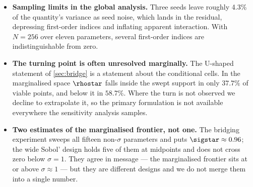 \begin{itemize}
  fixed at one, the implicit markup is already an outcome rather than a
  parameter. Endogenising it would require markup data of the kind assembled
  by \citet{DeLoecker2020}, and is declared future work.
  \item \textbf{Sampling limits in the global analysis.} Three seeds leave
  roughly 4.3\% of the quantity's variance as seed noise, which lands in the
  residual, depressing first-order indices and inflating apparent interaction.
  With $N = 256$ over eleven parameters, several first-order indices are
  indistinguishable from zero.
  \item \textbf{The turning point is often unresolved marginally.} The U-shaped
  statement of \cref{sec:bridge} is a statement about the conditional cells. In
  the marginalised space $\rhostar$ falls inside the swept support in only
  $37.7\%$ of viable points, and below it in $58.7\%$. Where the turn is not
  observed we decline to extrapolate it, so the primary formulation is not
  available everywhere the sensitivity analysis samples.
  \item \textbf{Two estimates of the marginalised frontier, not one.} The
  bridging experiment sweeps all fifteen non-$\sigma$ parameters and puts
  $\sigstar \approx 0.96$; the wide Sobol' design holds five of them at
  midpoints and does not cross zero below $\sigma = 1$. They agree in message
  --- the marginalised frontier sits at or above $\sigma \approx 1$ --- but
  they are different designs and we do not merge them into a single number.
\end{itemize}
